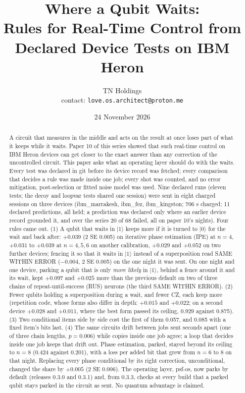 \documentclass[10pt,a4paper]{article}
\title{Where a Qubit Waits:\\ Rules for Real-Time Control from Declared Device Tests on IBM Heron}
\author{TN Holdings\\ \small contact: \texttt{love.os.architect@proton.me}}
\date{24 November 2026}
\newcommand{\ket}[1]{|#1\rangle}
\begin{document}
\maketitle

\begin{abstract}
A circuit that measures in the middle and acts on the result at once loses part of what it keeps while it waits. Paper 10
of this series showed that such real-time control on IBM Heron devices can get closer to the exact answer than any
correction of the uncontrolled circuit. This paper asks what an operating layer should do with the waits. Every test
was declared in git before its device record was fetched; every comparison that decides a rule was made inside one
job; every shot was counted, and no error mitigation, post-selection or fitted noise model was used. Nine declared runs (eleven tests; the decoy and loopvar tests shared one session) were sent in eight charged sessions
on three devices (ibm\_marrakesh, ibm\_fez, ibm\_kingston; 706 s charged; 11 declared predictions, all held; a prediction was declared only where an earlier device record
grounded it, and over the series 20 of 68 failed, all on paper 10's nights). Four rules came out. (1) A qubit that waits in $\ket{1}$ keeps more if it is turned to $\ket{0}$ for the wait and back
after: $+0.039$ (2 SE 0.005) on iterative phase estimation (IPE) at $n=4$, $+0.031$ to $+0.039$ at $n = 4,5,6$ on
another calibration, $+0.029$ and $+0.052$ on two further devices; fencing it so that it waits in $\ket{1}$ instead of a
superposition read SAME WITHIN ERROR ($-0.004$, 2 SE 0.005) on the one night it was sent. On one night and one device,
parking a qubit that is only \emph{more likely} in $\ket{1}$, behind a fence around it and its wait, kept $+0.097$ and
$+0.025$ more than the previous default on two of three chains of repeat-until-success (RUS) neurons (the third SAME
WITHIN ERROR). (2) Fewer qubits holding a superposition during a wait,
and fewer CZ, each keep more (repetition code, whose forms also differ in depth: $+0.015$ and $+0.022$; on a second device $+0.028$ and $+0.011$, where
the best form passed its ceiling, 0.929 against 0.875). (3) Two conditional items side by side cost the first of them 0.057, and 0.085 with a fixed item's bits last. (4) The same circuits drift between jobs sent seconds apart (one of three chain
lengths, $p = 0.006$) while copies inside one job agree; a loop that decides inside one job keeps that drift out.
Phase estimation, parked, stayed beyond its ceiling to $n = 8$ (0.424 against 0.201), with a loss per added bit that
grew from $n = 6$ to 8 on that night. Replacing every phase conditional by its right correction, unconditional, changed the share by $+0.005$ (2 SE 0.006).
The operating layer, psf-os, now parks by default (releases 0.3.0 and 0.3.1) and, from 0.3.3, checks at every build
that a parked qubit stays parked in the circuit as sent. No quantum advantage is claimed.
\end{abstract}
\end{document}
